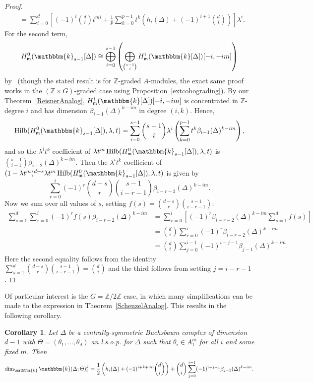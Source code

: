 \documentclass[10pt]{amsart}
\newtheorem{coro}[theo]{Corollary}
\theoremstyle{definition}
\DeclareMathOperator{\Hilb}{Hilb}
\newcommand{\field}{\mathbbm{k}}
\newcommand{\ZZ}{{\mathbb Z}}
\newcommand{\mideal}{\ensuremath{\mathfrak{m}}}
\begin{document}
\begin{proof}
\begin{align*}
&=\sum_{i=0}^d\left[(-1)^i\binom{d}{i}t^{mi}+\frac{1}{p}\sum_{k=0}^{p-1}t^k\left(h_i(\Delta)+(-1)^{i+1}\binom{d}{i}\right)\right]\lambda^i.
\end{align*}
For the second term,
\[
H_\mideal^0(\field_{s-1}[\Delta])\cong\bigoplus_{i=0}^{s-1}\left(\bigoplus_{\binom{s-1}{i}}H_\mideal^i(\field[\Delta])[-i, -im]\right)
\]
by~\cite[Proposition~II.4.14$'$]{StVo} (though the stated result is for $\ZZ$-graded $A$-modules, the exact same proof works in the $(\ZZ\times G)$-graded case using Proposition~\ref{extcohograding}). By our Theorem~\ref{ReisnerAnalog}, $H^i_\mideal(\field[\Delta])[-i, -im]$ is concentrated in $\ZZ$-degree $i$ and has dimension $\beta_{i-1}(\Delta)^{k-im}$ in degree $(i, k)$. Hence,
\[
\Hilb(H_\mideal^0(\field_{s-1}[\Delta]), \lambda, t)=\sum_{i=0}^{s-1}\binom{s-1}{i}\lambda^i\left(\sum_{k=0}^{p-1}t^k\beta_{i-1}(\Delta)^{k-im}\right),
\]
and so the $\lambda^it^k$ coefficient of $\lambda t^m\Hilb(H_\mideal^0(\field_{s-1}[\Delta]), \lambda, t)$ is $\binom{s-1}{i-1}\beta_{i-2}(\Delta)^{k-im}$. Then the $\lambda^it^k$ coefficient of $(1-\lambda t^m)^{d-s}\lambda t^m\Hilb(H_\mideal^0(\field_{s-1}[\Delta]), \lambda, t)$ is given by
\[
\sum_{r=0}^i(-1)^r\binom{d-s}{r}\binom{s-1}{i-r-1}\beta_{i-r-2}(\Delta)^{k-im}.
\]
Now we sum over all values of $s$, setting $f(s)=\binom{d-s}{r}\binom{s-1}{i-r-1}$:
\begin{align*}
\sum_{s=1}^d\sum_{r=0}^i(-1)^rf(s)\beta_{i-r-2}(\Delta)^{k-im}&=\sum_{r=0}^i\left[(-1)^r\beta_{i-r-2}(\Delta)^{k-im}\sum_{s=1}^df(s)\right]\\
&=\binom{d}{i}\sum_{r=0}^i(-1)^r\beta_{i-r-2}(\Delta)^{k-im}\\
&=\binom{d}{i}\sum_{j=0}^{i-1}(-1)^{i-j-1}\beta_{j-1}(\Delta)^{k-im}.
\end{align*}
Here the second equality follows from the identity $\sum_{s=1}^{d}\binom{d-s}{r}\binom{s-1}{i-r-1}=\binom{d}{i}$ and the third follows from setting $j=i-r-1$.
\end{proof}

Of particular interest is the $G=\ZZ/2\ZZ$ case, in which many simplifications can be made to the expression in Theorem~\ref{SchenzelAnalog}. This results in the following corollary.

\begin{coro}\label{CsSchenzel}
Let $\Delta$ be a centrally-symmetric Buchsbaum complex of dimension $d-1$ with $\Theta=(\theta_1, \ldots, \theta_d)$ an l.s.o.p. for $\Delta$ such that $\theta_i\in A_1^m$ for all $i$ and some fixed $m$. Then
\[
\dim_\field \field(\Delta; \Theta)_i^k = \frac{1}{2}\left(h_i(\Delta)+(-1)^{i+k+mi}\binom{d}{i}\right)+\binom{d}{i}\sum_{j=0}^{i-1}(-1)^{i-j-1}\beta_{j-1}(\Delta)^{k-im}.
\]
\end{coro}
\end{document}
